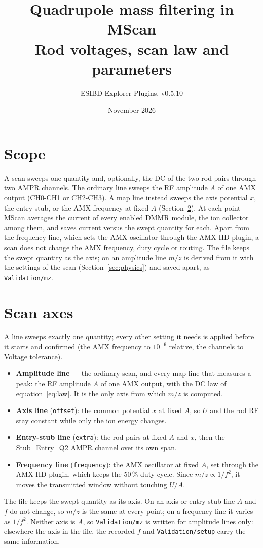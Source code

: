 \documentclass[10pt,a4paper]{article}
\title{\vspace{-8mm}Quadrupole mass filtering in MScan\\[2pt]
\large Rod voltages, scan law and parameters}
\author{ESIBD Explorer Plugins, v0.5.10}
\date{November 2026}
\newcommand{\setting}[1]{\textsf{#1}}
\begin{document}
\maketitle
\vspace{-6mm}

\section{Scope}
A scan sweeps one quantity and, optionally, the DC of the two rod pairs through two AMPR channels.
The ordinary line sweeps the RF amplitude $A$ of one AMX output (CH0-CH1 or CH2-CH3). A map line
instead sweeps the axis potential $x$, the entry stub, or the AMX frequency at fixed $A$
(Section~\ref{sec:axes}). At each point MScan averages the current of every enabled DMMR module, the
ion collector among them, and saves current versus the swept quantity for each. Apart from the
frequency line, which sets the AMX oscillator through the AMX HD plugin, a scan does not change the
AMX frequency, duty cycle or routing. The file keeps the swept quantity as the axis; on an amplitude
line $m/z$ is derived from it with the settings of the scan (Section~\ref{sec:physics}) and saved
apart, as \texttt{Validation/mz}.

\section{Scan axes}\label{sec:axes}
A line sweeps exactly one quantity; every other setting it needs is applied before it starts and
confirmed (the AMX frequency to $10^{-6}$ relative, the channels to \setting{Voltage tolerance}).
\begin{itemize}
\item \textbf{Amplitude line} --- the ordinary scan, and every map line that measures a peak: the RF
amplitude $A$ of one AMX output, with the DC law of equation~\eqref{eq:law}. It is the only axis
from which $m/z$ is computed.
\item \textbf{Axis line} (\texttt{offset}): the common potential $x$ at fixed $A$, so $U$ and the
rod RF stay constant while only the ion energy changes.
\item \textbf{Entry-stub line} (\texttt{extra}): the rod pairs at fixed $A$ and $x$, then the
\setting{Stub\_Entry\_Q2} AMPR channel over its own span.
\item \textbf{Frequency line} (\texttt{frequency}): the AMX oscillator at fixed $A$, set through the
AMX HD plugin, which keeps the 50\,\% duty cycle. Since $m/z\propto1/f^2$, it moves the transmitted
window without touching $U/A$.
\end{itemize}
The file keeps the swept quantity as its axis. On an axis or entry-stub line $A$ and $f$ do not
change, so $m/z$ is the same at every point; on a frequency line it varies as $1/f^2$. Neither axis
is $A$, so \texttt{Validation/mz} is written for amplitude lines only: elsewhere the axis in the
file, the recorded $f$ and \texttt{Validation/setup} carry the same information.
\end{document}
